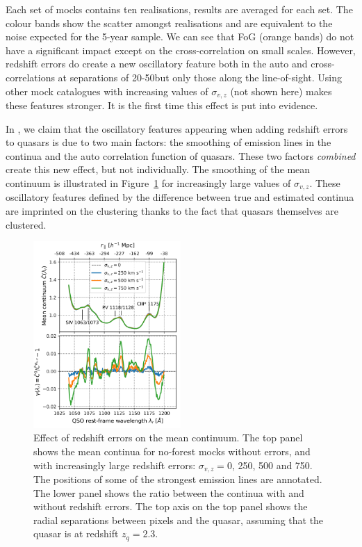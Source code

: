 Each set of mocks contains ten realisations, results are averaged for each set.
The colour bands show the scatter amongst realisations and are equivalent to the
noise expected for the 5-year sample. We can see that FoG (orange bands) do not 
have a significant impact except on the cross-correlation on small scales. 
However, redshift errors do create a new oscillatory feature both in the auto 
and cross-correlations at separations of 20-50\hmpc but only those along the 
line-of-sight. Using other mock catalogues with increasing values of 
$\sigma_{v, z}$ (not shown here) makes these features stronger. 
It is the first time this effect is put into evidence. 

In \cite{youlesEffectQuasarRedshift2022a}, we claim that the oscillatory
features appearing when adding redshift errors to quasars is due to 
two main factors: the smoothing of emission lines in the continua and 
the auto correlation function of  quasars. 
These two factors \emph{combined} create this new effect, but not individually. 
The smoothing of the mean continuum is illustrated in Figure~\ref{fig:zerrors_continua}
for increasingly large values of $\sigma_{v, z}$. 
These oscillatory features defined by the difference between true and estimated continua are imprinted 
on the clustering thanks to the fact that quasars themselves are clustered. 


\begin{figure}
    \centering 
    \includegraphics[width=0.5\textwidth]{fig/forests/zerros_impact_continua.png}
    \caption{Effect of redshift errors on the mean continuum. 
    The top panel shows the mean continua for no-forest mocks without errors, 
    and with increasingly large redshift errors: $\sigma_{v, z} = 0$, 250, 500 and 750\kms. 
    The positions of some of the strongest emission lines are annotated. 
    The lower panel shows the ratio between the continua with and without redshift errors. 
    The top axis on the top panel shows the radial separations between pixels and the quasar, 
    assuming that the quasar is at redshift $z_q = 2.3$.}
    \label{fig:zerrors_continua}
\end{figure}

